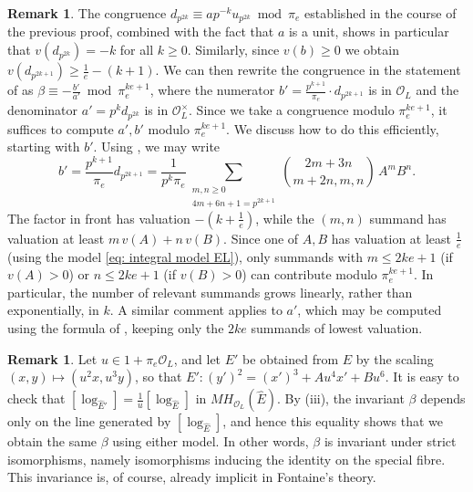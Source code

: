 \documentclass{amsart}
\theoremstyle{definition}
\newtheorem{remark}[theorem]{Remark}
\numberwithin{theorem}{section}
\numberwithin{equation}{section}
\begin{document}
\begin{remark}
The congruence $d_{p^{2k}} \equiv a p^{-k} u_{p^{2k}} \bmod{\pi_e}$ established in the course of the previous proof, combined with the fact that $a$ is a unit, shows in particular that $v(d_{p^{2k}})=-k$ for all $k \geq 0$. Similarly, since $v(b) \geq 0$ we obtain $v(d_{p^{2k+1}}) \geq \frac{1}{e} -(k+1)$.
We can then rewrite the congruence in the statement of  as $\beta \equiv -\frac{b'}{a'} \bmod{\pi_e^{ke+1}}$, where the numerator $b'=\frac{p^{k+1}}{\pi_e} \cdot d_{p^{2k+1}}$ is in $\mathcal{O}_L$ and the denominator $a'=p^k d_{p^{2k}}$ is in $\mathcal{O}_L^\times$. Since we take a congruence modulo $\pi_e^{ke+1}$, it suffices to compute $a',b'$ modulo $\pi_e^{ke+1}$. We discuss how to do this efficiently, starting with $b'$. Using , we may write
\[
b'=\frac{p^{k+1}}{\pi_e} d_{p^{2k+1}} = \frac{1}{p^{k} \pi_e} \sum_{\substack{m,n\ge 0 \\ 4m+6n+1 = p^{2k+1}}}
{2m+3n \choose m+2n, m, n} \,A^mB^n.
\]
The factor in front has valuation $-(k+\frac{1}{e})$, while the $(m,n)$ summand has valuation at least $m\,v(A)+n\,v(B)$. Since one of $A,B$ has valuation at least $\frac{1}{e}$ (using the model \eqref{eq: integral model EL}), only summands with $m \leq 2ke+1$ (if $v(A)>0$) or
$n \leq  2ke+1$ (if $v(B)>0$) can contribute modulo $\pi_e^{ke+1}$. 
In particular, the number of relevant summands grows linearly, rather than exponentially, in $k$. A similar comment applies to $a'$, which may be computed using the formula of , keeping only the $2ke$ summands of lowest valuation.
\end{remark}


\begin{remark}\label{rmk: invariance under strict isomorphisms}
Let $u\in 1+\pi_e\mathcal{O}_L$, and let $E'$ be obtained from $E$ by the scaling $(x,y)\mapsto(u^2x,u^3y)$, so that
$E' : (y')^2=(x')^3+A u^4 x'+B u^6$. It is easy to check that $[\log_{\widehat{E}'}]=\frac{1}{u}[\log_{\widehat{E}}]$ in $MH_{\mathcal{O}_L}(\widehat{E})$. By (iii), the invariant $\beta$ depends only on the line generated by $[\log_{\widehat{E}}]$, and hence this equality shows that we obtain the same $\beta$ using either model. In other words, $\beta$ is invariant under strict isomorphisms, namely isomorphisms inducing the identity on the special fibre. This invariance is, of course, already implicit in Fontaine's theory.
\end{remark}
\end{document}
